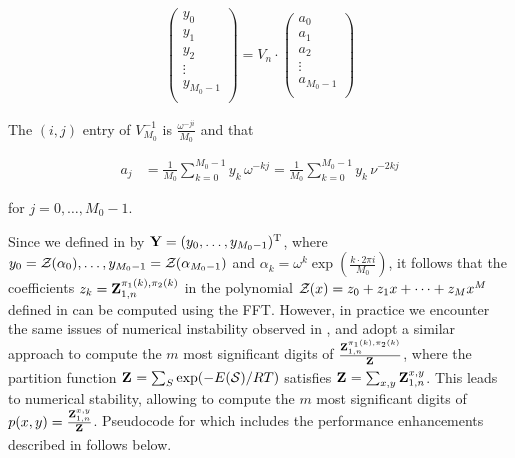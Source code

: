 \begin{align}
\label{eq:ffttwo:dftMatrix}
\left(
\begin{array}{l}
y_0 \\
y_1 \\
y_2 \\
\vdots \\
y_{M_0-1} \\
\end{array}
\right)
= V_n \cdot
\left(
\begin{array}{l}
a_0 \\
a_1 \\
a_2 \\
\vdots \\
a_{M_0-1} \\
\end{array}
\right)
\end{align}

The $(i,j)$ entry of $V_{M_0}^{-1}$ is $\frac{\omega^{-j i}}{M_0}$
and that

\begin{align}
\label{eq:ffttwo:aFromY}
a_j &=\frac{1}{M_0} \sum_{k=0}^{M_0-1} y_k\, \omega^{-kj}
=\frac{1}{M_0} \sum_{k=0}^{M_0-1} y_k\, \nu^{-2kj}
\end{align}

for $j=0,\dots,M_0-1$.

Since we defined \bfY in  by ${\bf Y} =
(y_0,\dots,y_{M_0-1})^{\text T}$, where
$y_0={\mathcal Z}_{}(\alpha_0),\dots,\allowbreak y_{M_0-1}={\mathcal Z}_{}(\alpha_{M_0-1})$
and $\alpha_k = \omega^k
\exp(\frac{k \cdot 2\pi i}{M_0})$,
it follows that the coefficients
$z_k={\bf Z}^{\pi_1(k),\pi_2(k)}_{1,n}$ in the polynomial
${\mathcal Z}_{}(x) = z_0 + z_1 x + \dots + z_{M} x^{M}$ defined in
 can be computed using the FFT.
However, in practice we encounter the same issues of numerical instability
observed in , and adopt a similar approach
to compute the $m$ most significant
digits of $\frac{{\bf Z}^{\pi_1(k),\pi_2(k)}_{1,n}}{{\bf Z}^{}_{}}$,
where the partition function ${\bf Z}^{}_{} = \sum_{S} \exp(-E(\mathcal S)/RT)$ satisfies
${{\bf Z}^{}_{}} = \sum_{x,y} {\bf Z}^{x,y}_{1,n}$. This leads to numerical stability,
allowing \ffttwo to compute the
$m$ most significant digits of $p(x,y) = \frac{{\bf Z}^{x,y}_{1,n}}{{\bf Z}^{}_{}}$.
Pseudocode for \ffttwo which includes the performance enhancements described in
 follows below.
\medskip

